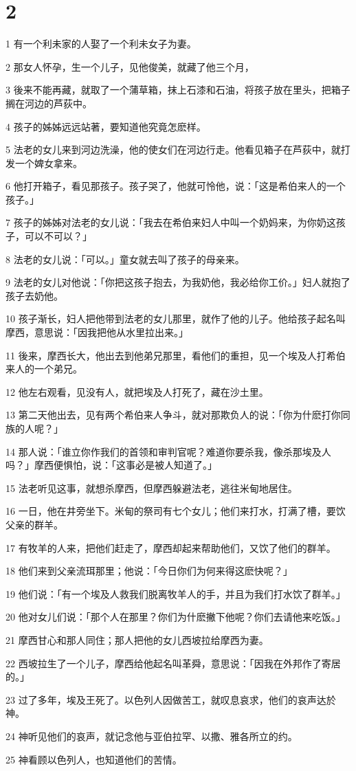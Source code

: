 \chapter{2}

\par 1 有一个利未家的人娶了一个利未女子为妻。
\par 2 那女人怀孕，生一个儿子，见他俊美，就藏了他三个月，
\par 3 後来不能再藏，就取了一个蒲草箱，抹上石漆和石油，将孩子放在里头，把箱子搁在河边的芦荻中。
\par 4 孩子的姊姊远远站著，要知道他究竟怎麽样。
\par 5 法老的女儿来到河边洗澡，他的使女们在河边行走。他看见箱子在芦荻中，就打发一个婢女拿来。
\par 6 他打开箱子，看见那孩子。孩子哭了，他就可怜他，说：「这是希伯来人的一个孩子。」
\par 7 孩子的姊姊对法老的女儿说：「我去在希伯来妇人中叫一个奶妈来，为你奶这孩子，可以不可以？」
\par 8 法老的女儿说：「可以。」童女就去叫了孩子的母亲来。
\par 9 法老的女儿对他说：「你把这孩子抱去，为我奶他，我必给你工价。」妇人就抱了孩子去奶他。
\par 10 孩子渐长，妇人把他带到法老的女儿那里，就作了他的儿子。他给孩子起名叫摩西，意思说：「因我把他从水里拉出来。」
\par 11 後来，摩西长大，他出去到他弟兄那里，看他们的重担，见一个埃及人打希伯来人的一个弟兄。
\par 12 他左右观看，见没有人，就把埃及人打死了，藏在沙土里。
\par 13 第二天他出去，见有两个希伯来人争斗，就对那欺负人的说：「你为什麽打你同族的人呢？」
\par 14 那人说：「谁立你作我们的首领和审判官呢？难道你要杀我，像杀那埃及人吗？」摩西便惧怕，说：「这事必是被人知道了。」
\par 15 法老听见这事，就想杀摩西，但摩西躲避法老，逃往米甸地居住。
\par 16 一日，他在井旁坐下。米甸的祭司有七个女儿；他们来打水，打满了槽，要饮父亲的群羊。
\par 17 有牧羊的人来，把他们赶走了，摩西却起来帮助他们，又饮了他们的群羊。
\par 18 他们来到父亲流珥那里；他说：「今日你们为何来得这麽快呢？」
\par 19 他们说：「有一个埃及人救我们脱离牧羊人的手，并且为我们打水饮了群羊。」
\par 20 他对女儿们说：「那个人在那里？你们为什麽撇下他呢？你们去请他来吃饭。」
\par 21 摩西甘心和那人同住；那人把他的女儿西坡拉给摩西为妻。
\par 22 西坡拉生了一个儿子，摩西给他起名叫革舜，意思说：「因我在外邦作了寄居的。」
\par 23 过了多年，埃及王死了。以色列人因做苦工，就叹息哀求，他们的哀声达於神。
\par 24 神听见他们的哀声，就记念他与亚伯拉罕、以撒、雅各所立的约。
\par 25 神看顾以色列人，也知道他们的苦情。

